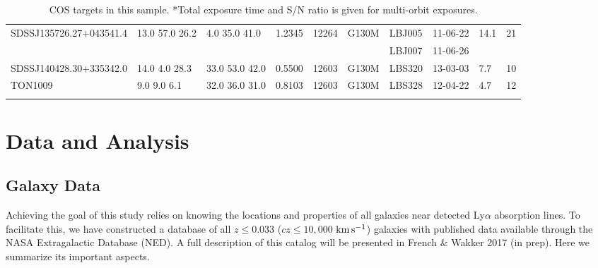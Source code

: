 \documentclass[iop]{emulateapj-rtx4}
\begin{document}
\begin{table}[ht]
\begin{center}
\begin{tabular}{l l l l l l l l l l}
SDSSJ135726.27+043541.4 & 13.0  57.0  26.2 &    4.0  35.0  41.0  &    1.2345  & 12264      &   G130M  &   LBJ005  		& 11-06-22		   & 14.1  &      21         \\
				        	     & 	  	  	        &    		  	       &    	  	 & 	  	    &                &   LBJ007  			& 11-06-26		   &          &                   \\
SDSSJ140428.30+335342.0 & 14.0  4.0  28.3  &   33.0  53.0  42.0  &    0.5500  & 12603  	    &   G130M  &  LBS320   		& 13-03-03   		   &   7.7  &      10          \\
TON1009  			    &    9.0  9.0  6.1   &    32.0  36.0  31.0  &    0.8103  & 12603  	    &   G130M  &  LBS328   		& 12-04-22   		   &   4.7  &      12         \\

 \\
\hline

\end{tabular}
\end{center}
  \caption{\small{COS targets in this sample. *Total exposure time and S/N ratio is given for multi-orbit exposures.}}
  \label{target_table}
\end{table}


\section{Data and Analysis}

\subsection{Galaxy Data}

Achieving the goal of this study relies on knowing the locations and properties of all galaxies near detected Ly$\alpha$ absorption lines. To facilitate this, we have constructed a database of all $z\leq 0.033$ ($cz\leq 10,000$ $\rm km\, s^{-1}$) galaxies with published data available through the NASA Extragalactic Database (NED). A full description of this catalog will be presented in French $\&$ Wakker 2017 (in prep). Here we summarize its important aspects. 
\end{document}
